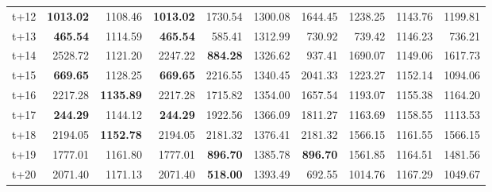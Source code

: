 \begin{table}[H]
\begin{tabular}{lrrrrrrrrr}
t+12  & \textbf{1013.02}  & 1108.46  & \textbf{1013.02}  & 1730.54  & 1300.08  & 1644.45  & 1238.25  & 1143.76  & 1199.81  \\
t+13  & \textbf{465.54}  & 1114.59  & \textbf{465.54}  & 585.41  & 1312.99  & 730.92  & 739.42  & 1146.23  & 736.21  \\
t+14  & 2528.72  & 1121.20  & 2247.22  & \textbf{884.28}  & 1326.62  & 937.41  & 1690.07  & 1149.06  & 1617.73  \\
t+15  & \textbf{669.65}  & 1128.25  & \textbf{669.65}  & 2216.55  & 1340.45  & 2041.33  & 1223.27  & 1152.14  & 1094.06  \\
t+16  & 2217.28  & \textbf{1135.89}  & 2217.28  & 1715.82  & 1354.00  & 1657.54  & 1193.07  & 1155.38  & 1164.20  \\
t+17  & \textbf{244.29}  & 1144.12  & \textbf{244.29}  & 1922.56  & 1366.09  & 1811.27  & 1163.69  & 1158.55  & 1113.53  \\
t+18  & 2194.05  & \textbf{1152.78}  & 2194.05  & 2181.32  & 1376.41  & 2181.32  & 1566.15  & 1161.55  & 1566.15  \\
t+19  & 1777.01  & 1161.80  & 1777.01  & \textbf{896.70}  & 1385.78  & \textbf{896.70}  & 1561.85  & 1164.51  & 1481.56  \\
t+20  & 2071.40  & 1171.13  & 2071.40  & \textbf{518.00}  & 1393.49  & 692.55  & 1014.76  & 1167.29  & 1049.67  \\

\bottomrule
\end{tabular}
\end{table}
